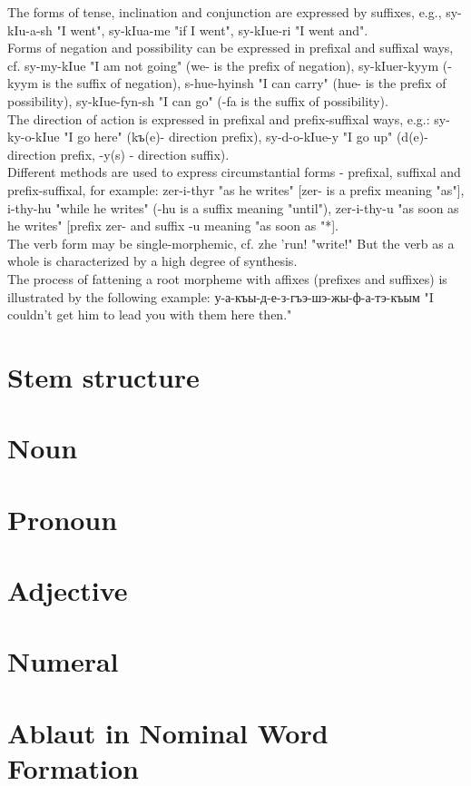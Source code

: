 \documentclass[a4paper,12pt]{book}
\newcommand{\1}[1]{\textbf{\emph{#1}}} %
\newcommand{\2}[1]{\textbf{[#1]}} %
\newcommand{\3}[1]{\fontsize{11pt}{0cm}\textbf{\emph{#1}}} %
\newcommand{\4}[1]{\fontsize{10pt}{0cm}\emph{#1}}	%
\newcommand{\5}[1]{\textbf{/#1/}} %
\newcommand{\6}[1]{\textbf{[#1]}} %
\newcommand{\7}[1]{\fontsize{12pt}{0cm}\emph{#1}} %
\newcommand{\8}[1]{\fontsize{12pt}{0cm}`#1'} %
\newcommand{\9}[1]{\fontsize{12pt}{0cm}(lit. `#1')} %
\begin{document}
The forms of tense, inclination and conjunction are expressed by suffixes, e.g., sy-kIu-a-sh "I went", sy-kIua-me "if I went", sy-kIue-ri "I went and".\\
Forms of negation and possibility can be expressed in prefixal and suffixal ways, cf. sy-my-kIue "I am not going" (we- is the prefix of negation), sy-kIuer-kyym (-kyym is the suffix of negation), s-hue-hyinsh "I can carry" (hue- is the prefix of possibility), sy-kIue-fyn-sh "I can go" (-fa is the suffix of possibility).\\
The direction of action is expressed in prefixal and prefix-suffixal ways, e.g.: sy-ky-o-kIue "I go here" (kъ(e)- direction prefix), sy-d-o-kIue-y "I go up" (d(e)- direction prefix, -y(s) - direction suffix).\\
Different methods are used to express circumstantial forms - prefixal, suffixal and prefix-suffixal, for example: zer-i-thyr "as he writes" [zer- is a prefix meaning "as"], i-thy-hu "while he writes" (-hu is a suffix meaning "until"), zer-i-thy-u "as soon as he writes" [prefix zer- and suffix -u meaning "as soon as "*].\\
The verb form may be single-morphemic, cf. zhe 'run! "write!" But the verb as a whole is characterized by a high degree of synthesis.\\
The process of fattening a root morpheme with affixes (prefixes and suffixes) is illustrated by the following example:
у-а-къы-д-е-з-гъэ-шэ-жы-ф-а-тэ-къым "I couldn't get him to lead you with them here then."\\

\section{Stem structure}
\section{Noun}
\section{Pronoun}
\section{Adjective}
\section{Numeral}
\section{Ablaut in Nominal Word Formation}
\end{document}
